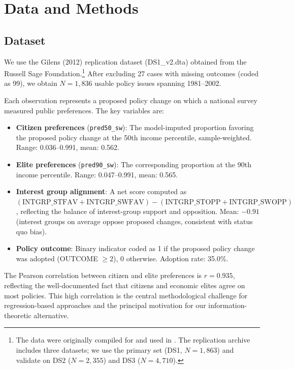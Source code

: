 \documentclass[twocolumn,10pt]{article}
\begin{document}
\section{Data and Methods}
\label{sec:data}

\subsection{Dataset}

We use the Gilens (2012) replication dataset (DS1\_v2.dta) obtained from the Russell Sage Foundation.\footnote{The data were originally compiled for \citet{gilens2012} and used in \citet{gilens2014testing}.  The replication archive includes three datasets; we use the primary set (DS1, $N = 1{,}863$) and validate on DS2 ($N = 2{,}355$) and DS3 ($N = 4{,}710$).}  After excluding 27 cases with missing outcomes (coded as 99), we obtain $N = 1{,}836$ usable policy issues spanning 1981--2002.

Each observation represents a proposed policy change on which a national survey measured public preferences.  The key variables are:

\begin{itemize}
\item \textbf{Citizen preferences} (\texttt{pred50\_sw}): The model-imputed proportion favoring the proposed policy change at the 50th income percentile, sample-weighted.  Range: 0.036--0.991, mean: 0.562.
\item \textbf{Elite preferences} (\texttt{pred90\_sw}): The corresponding proportion at the 90th income percentile.  Range: 0.047--0.991, mean: 0.565.
\item \textbf{Interest group alignment}: A net score computed as $(\text{INTGRP\_STFAV} + \text{INTGRP\_SWFAV}) - (\text{INTGRP\_STOPP} + \text{INTGRP\_SWOPP})$, reflecting the balance of interest-group support and opposition.  Mean: $-0.91$ (interest groups on average oppose proposed changes, consistent with status quo bias).
\item \textbf{Policy outcome}: Binary indicator coded as 1 if the proposed policy change was adopted (OUTCOME $\geq 2$), 0 otherwise.  Adoption rate: 35.0\%.
\end{itemize}

The Pearson correlation between citizen and elite preferences is $r = 0.935$, reflecting the well-documented fact that citizens and economic elites agree on most policies.  This high correlation is the central methodological challenge for regression-based approaches and the principal motivation for our information-theoretic alternative.
\end{document}
